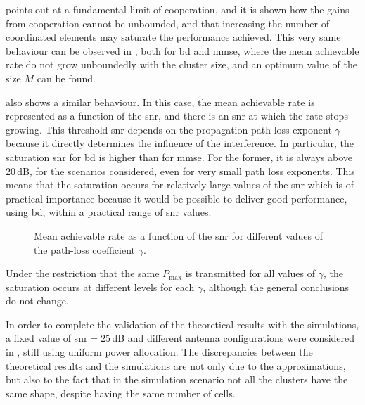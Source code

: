 \cite{lozano13} points out at a fundamental limit of cooperation, and it is
shown how the gains from cooperation cannot be unbounded, and that increasing
the number of coordinated elements may saturate the performance achieved. This
very same behaviour can be observed in , both for
\gls{bd} and \gls{mmse}, where the mean achievable rate do not grow unboundedly
with the cluster size, and an optimum value of the size $M$ can be found.

 also shows a similar behaviour. In this case, the
mean achievable rate is represented as a function of the \gls{snr}, and there is
an \gls{snr} at which the rate stops growing. This threshold \gls{snr} depends
on the propagation path loss exponent $\gamma$ because it directly determines
the influence of the interference. In particular, the saturation \gls{snr} for
\gls{bd} is higher than for \gls{mmse}. For the former, it is always above
20\,dB, for the scenarios considered, even for very small path loss exponents.
This means that the saturation occurs for relatively large values of the
\gls{snr} which is of practical importance because it would be possible to
deliver good performance, using \gls{bd}, within a practical range of \gls{snr}
values.

\begin{figure}[t]
\begin{center}
    \dummybox
\end{center}
\caption{Mean achievable rate as a function of the \gls{snr} for different
values of the path-loss coefficient $\gamma$.}
\label{fig:rate_vs_snr_gamma}
\end{figure}

Under the restriction that the same $P_{\max}$ is transmitted for all values of
$\gamma$, the saturation occurs at different levels for each $\gamma$, although
the general conclusions do not change.

In order to complete the validation of the theoretical results with the
simulations, a fixed value of \gls{snr}$=25$\,dB and different antenna
configurations were considered in , still using
uniform power allocation. The discrepancies between the theoretical results and
the simulations are not only due to the approximations, but also to the fact
that in the simulation scenario not all the clusters have the same shape,
despite having the same number of cells.

